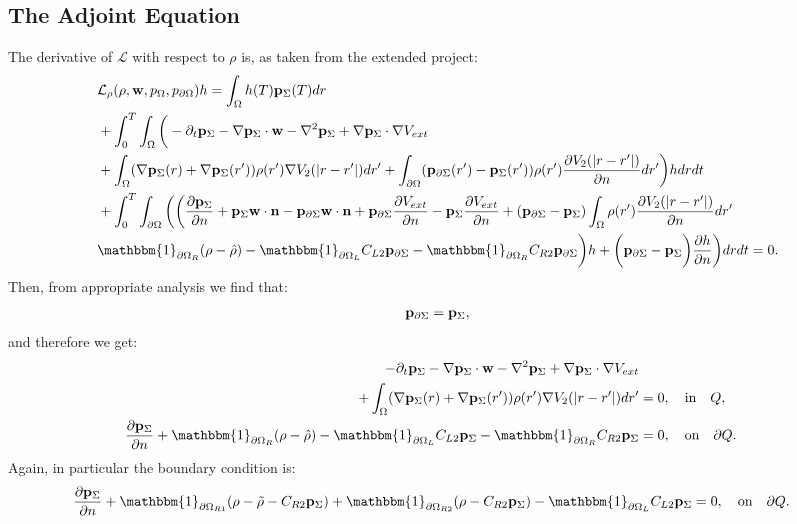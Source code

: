 \subsection*{The Adjoint Equation}
The derivative of $\mathcal{L}$ with respect to $\rho$ is, as taken from the extended project:
\begin{align*}
&\mathcal{L}_\rho (\rho,\mathbf{w},p_\Omega,p_{\partial \Omega})h=
\int_\Omega h(T) \Adja(T) dr\\
&+ \int_0^T \int_\Omega \bigg(   - \partial_t \Adja  - \nabla \Adja \cdot \mathbf{w}  - \nabla^2 \Adja \notag 
+  \nabla \Adja \cdot \nabla V_{ext}  \notag \\
&+ \int_\Omega (\nabla  \Adja(r)+\nabla  \Adja(r')) \rho(r') \nabla V_2(|r-r'|) dr'+ \int_{\partial \Omega} ( \Adjc(r') - \Adja(r')) \rho(r')   \frac{\partial V_2(|r-r'|)}{\partial n} dr' \bigg) h dr dt \\
&+  \int_0^T\int_{\partial \Omega}  \bigg(
\bigg(\frac{\partial \Adja }{\partial n} + \Adja  \mathbf{w} \cdot \mathbf{n} - \Adjc \mathbf{w} \cdot \mathbf{n}  +  \Adjc \dfrac{\partial V_{ext}}{\partial n} - \Adja \frac{\partial V_{ext}}{\partial n} + ( \Adjc - \Adja)  \int_\Omega \rho(r') \frac{\partial V_2(|r-r'|)}{\partial n} dr'\\
&\mathbbm{1}_{\partial \Omega_R} (\rho- \hat{\rho}) -\mathbbm{1}_{\partial \Omega_L} C_{L2} \Adjc   -\mathbbm{1}_{\partial \Omega_R} C_{R2} \Adjc \bigg)h + \bigg( \Adjc- \Adja \bigg) \frac{\partial h}{\partial n} \bigg) dr dt =0.
\end{align*}
Then, from appropriate analysis we find that:
\begin{align*}
\mathbf{p}_{\partial \Sigma} = \mathbf{p}_\Sigma,
\end{align*}
and therefore we get:
\begin{align*}
- \partial_t  \Adja  - \nabla \Adja \cdot \mathbf{w}  - \nabla^2 \Adja \notag 
+  \nabla \Adja \cdot \nabla V_{ext}  \notag \\
+ \int_\Omega (\nabla  \Adja(r)+\nabla  \Adja(r')) \rho(r') \nabla V_2(|r-r'|) dr' &=0, \quad \text{in} \quad Q, \\
\frac{\partial \Adja }{\partial n}+ \mathbbm{1}_{\partial \Omega_R} (\rho- \hat{\rho}) -\mathbbm{1}_{\partial \Omega_L} C_{L2} \Adja   -\mathbbm{1}_{\partial \Omega_R} C_{R2} \Adja&=0, \quad \text{on} \quad \partial Q.
\end{align*}
Again, in particular the boundary condition is:
\begin{align*}
\frac{\partial \Adja }{\partial n}+ \mathbbm{1}_{\partial \Omega_{R1}}(\rho- \tilde{\rho} -C_{R2} \Adja) + \mathbbm{1}_{\partial \Omega_{R2}} (\Sta-C_{R2} \Adja) - \mathbbm{1}_{\partial \Omega_L} C_{L2} \Adja   &=0, \quad \text{on} \quad \partial Q.
\end{align*}


